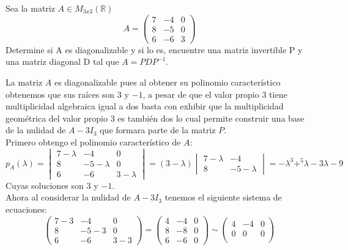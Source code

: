 \documentclass[letter]{memoir} %
\newenvironment{cframed}[1][blue]
  {\begin{tcolorbox}[colframe=#1,colback=white]}
  {\end{tcolorbox}}
\begin{document}
\begin{enumerate}
\begin{cframed}[teal]
\item Sea la matriz $A \in M_{3x3}(\mathbb{R})$
\[ A = \begin{pmatrix}
	7&-4&0\\
	8&-5&0\\
	6&-6&3
	\end{pmatrix}\]
Determine si A es diagonalizable y si lo es, encuentre una matriz invertible P y una matriz diagonal D tal que $A = PDP^{-1}$.
\end{cframed}
La matriz $A$ es diagonalizable pues al obtener su polinomio característico obtenemos que sus raíces son $3$ y $-1$, a pesar de que el valor propio $3$ tiene multiplicidad algebraica igual a dos basta con exhibir que la multiplicidad geométrica del valor propio $3$ es también dos lo cual permite construir una base de la nulidad de $A-3I_3$  que formara parte de la matriz $P$. \\
Primero obtengo el polinomio característico de $A$:\\  
\[
	p_A(\lambda) = \begin{vmatrix}
    				7 -\lambda & -4 & 0\\
                    8 & -5 -\lambda & 0\\
                    6 & -6 & 3-\lambda
    				\end{vmatrix} =
                    (3-\lambda) \begin{vmatrix}
                    				7-\lambda & -4 \\
                                    8 & -5 - \lambda
                                    \end{vmatrix} = -\lambda^3+^5\lambda-3\lambda-9
\]
Cuyas soluciones son $3$ y $-1$.\\
Ahora al considerar la nulidad de $A-3I_3$ tenemos el siguiente sistema de ecuaciones:\\
\[
	 \begin{pmatrix}
    7 -3 & -4 & 0\\
    8 & -5 -3 & 0\\
    6 & -6 & 3-3
    \end{pmatrix} =
	 \begin{pmatrix}
    4 & -4 & 0\\
    8 & -8 & 0\\
    6 & -6 & 0
    \end{pmatrix} \sim
    	 \begin{pmatrix}
    4 & -4 & 0\\
    0 & 0 & 0\\

\end{pmatrix}\]
\end{enumerate}
\end{document}
